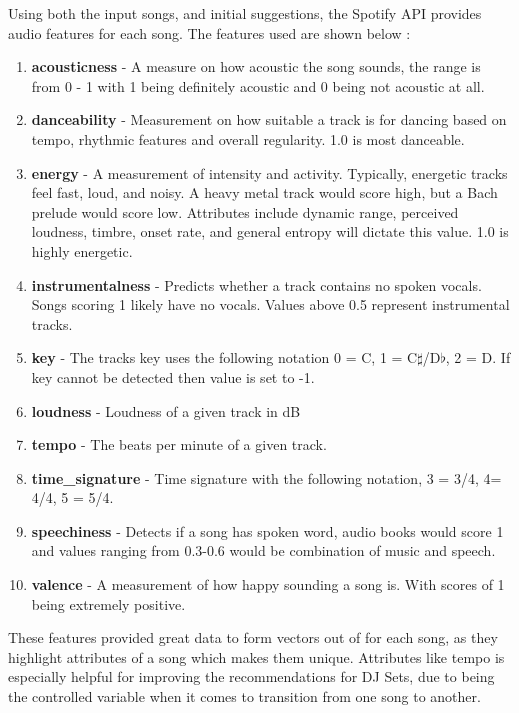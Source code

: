 Using both the input songs, and initial suggestions, the Spotify API provides audio features for each song. The features used are shown below \citep{spotify_web_2023}:

\begin{enumerate}
	\item \textbf{acousticness} - A measure on how acoustic the song sounds, the range is from 0 - 1 with 1 being definitely acoustic and 0 being not acoustic at all.
	\item \textbf{danceability} - Measurement on how suitable a track is for dancing based on tempo, rhythmic features and overall regularity. 1.0 is most danceable. 
	\item \textbf{energy} - A measurement of intensity and activity. Typically, energetic tracks feel fast, loud, and noisy. A heavy metal track would score high, but a Bach prelude would score low. Attributes include dynamic range, perceived loudness, timbre, onset rate, and general entropy will dictate this value. 1.0 is highly energetic.
	\item \textbf{instrumentalness} - Predicts whether a track contains no spoken vocals. Songs scoring 1 likely have no vocals. Values above 0.5 represent instrumental tracks.
	\item \textbf{key} - The tracks key uses the following notation 0 = C, 1 = C$\sharp$/D$\flat$, 2 = D. If key cannot be detected then value is set to -1.
	\item \textbf{loudness} - Loudness of a given track in dB
	\item \textbf{tempo} - The beats per minute of a given track.
	\item \textbf{time\_signature} - Time signature with the following notation, 3 = 3/4, 4= 4/4, 5 = 5/4.
	\item \textbf{speechiness} - Detects if a song has spoken word, audio books would score 1 and values ranging from 0.3-0.6 would be combination of music and speech.
	\item \textbf{valence} - A measurement of how happy sounding a song is. With scores of 1 being extremely positive.
	
\end{enumerate}

These features provided great data to form vectors out of for each song, as they highlight attributes of a song which makes them unique. Attributes like tempo is especially helpful for improving the recommendations for DJ Sets, due to being the controlled variable when it comes to transition from one song to another.

